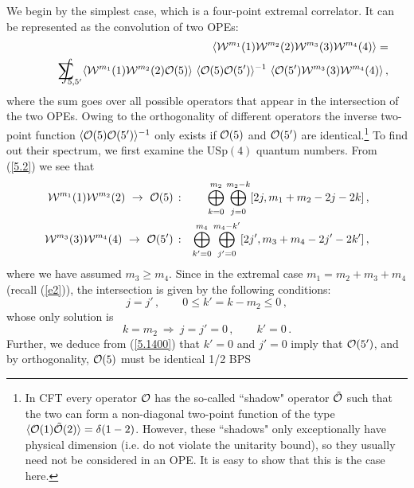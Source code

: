 \documentclass[a4paper,11pt]{article}
\begin{document}
We begin by the simplest case, which is a four-point extremal correlator.
It can be represented as the convolution of two OPEs:
\begin{eqnarray}
  && \langle {\cal W}^{m_1}(1) {\cal W}^{m_2}(2) {\cal W}^{m_3}(3) {\cal W}^{m_4}(4) \rangle =
  \label{e3} \\
  &&\qquad \sum \hskip-13pt\int_{5,5'}
  \langle {\cal W}^{m_1}(1) {\cal W}^{m_2}(2) {\cal O}(5) \rangle \
  \langle  {\cal O}(5)  {\cal O}(5') \rangle^{-1} \
\langle  {\cal O}(5') {\cal W}^{m_3}(3) {\cal W}^{m_4}(4)\rangle \, , \nonumber
\end{eqnarray}
where the sum goes over all possible operators that appear in the intersection
of the two OPEs. Owing to the orthogonality of different operators the inverse
two-point function $\langle  {\cal O}(5)  {\cal O}(5') \rangle^{-1}$ only
exists if ${\cal O}(5)$ and ${\cal O}(5')$ are identical.\footnote{In CFT every
operator ${\cal O}$ has the so-called ``shadow" operator $\tilde {\cal O}$
such that the two can form a non-diagonal two-point function of the type
$\langle {\cal O}(1) \tilde {\cal O}(2) \rangle = \delta(1-2)$. However, these
``shadows" only exceptionally have physical dimension (i.e. do not violate the
unitarity bound), so they usually need not be considered in an OPE. It is easy
to show that this is the case here.} To find out their spectrum, we first
examine the $\mbox{USp}(4)$ quantum numbers. From (\ref{5.2}) we see that
\begin{eqnarray}
 {\cal W}^{m_1}(1) {\cal W}^{m_2}(2) \ \rightarrow \ {\cal O}(5)\,: &&
 \bigoplus_{k=0}^{m_2}
  \bigoplus_{j=0}^{m_2-k}[2j,m_1+m_2-2j-2k]\, , \nonumber\\
  {\cal W}^{m_3}(3) {\cal W}^{m_4}(4) \ \rightarrow \ {\cal O}(5')\,: &&
 \bigoplus_{k'=0}^{m_4}
  \bigoplus_{j'=0}^{m_4-k'}[2j',m_3+m_4-2j'-2k']\,, \label{e4}
\end{eqnarray}
where we have assumed $m_3 \geq m_4$. Since in the extremal case
$m_1=m_2+m_3+m_4$ (recall (\ref{e2})), the intersection is given by the
following conditions:
\begin{equation}\label{e5}
  j=j'\,, \qquad 0 \leq k' = k-m_2 \leq 0\,,
\end{equation}
whose only solution is
\begin{equation}\label{e6}
  k=m_2 \ \Rightarrow \ j=j'=0\,, \qquad k'=0 \,.
\end{equation}
Further, we deduce from (\ref{5.1400}) that $k'=0$ and $j'=0$ imply that ${\cal
O}(5')$, and by orthogonality, ${\cal O}(5)$ must be identical 1/2 BPS
\end{document}
